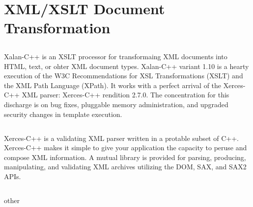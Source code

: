\section{XML/XSLT Document Transformation}



\subsection{}
Xalan-C++ is an XSLT processor for transformaing XML documents into HTML, text, or ohter XML document types. Xalan-C++ variant 1.10 is a hearty execution of the W3C Recommendations for XSL Transformations (XSLT) and the XML Path Language (XPath). It works with a perfect arrival of the Xerces-C++ XML parser: Xerces-C++ rendition 2.7.0. The concentration for this discharge is on bug fixes, pluggable memory administration, and upgraded security changes in template execution.
\subsection{}
Xerces-C++ is a validating XML parser written in a protable subset of C++. Xerces-C++ makes it simple to give your application the capacity to peruse and compose XML information. A mutual library is provided for  parsing, producing, manipulating, and validating XML archives utilizing the DOM, SAX, and SAX2 APIs.

\subsection{}
other


